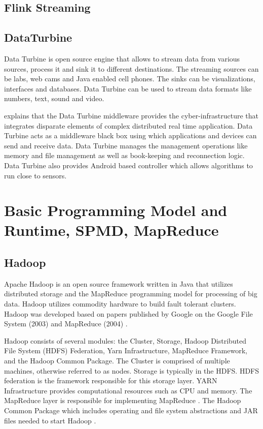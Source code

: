 \subsection{ Flink Streaming}
\subsection{ DataTurbine}

     Data Turbine \cite{www-data-turbine} is open source engine that
     allows to stream data from various sources, process it and sink
     it to different destinations. The streaming sources can be labs,
     web cams and Java enabled cell phones. The sinks can be
     visualizations, interfaces and databases.  Data Turbine can be
     used to stream data formats like numbers, text, sound and video.

     \cite{osdt-ecologicalsociety} explains that the Data Turbine
     middleware provides the cyber-infrastructure that integrates
     disparate elements of complex distributed real time
     application. Data Turbine acts as a middleware black box using
     which applications and devices can send and receive data. Data
     Turbine manages the management operations like memory and file
     management as well as book-keeping and reconnection logic.  Data
     Turbine also provides Android based controller which allows
     algorithms to run close to sensors.


\section{Basic Programming Model and Runtime, SPMD, MapReduce}


\subsection{ Hadoop}

     Apache Hadoop is an open source framework written in Java that 
     utilizes distributed storage and the MapReduce programming model 
     for processing of big data. Hadoop utilizes commodity hardware to 
     build fault tolerant clusters.  Hadoop was developed based on 
     papers published by Google on the Google File System (2003) and 
     MapReduce (2004) \cite{www-wikihadoop}.

     Hadoop consists of several modules: the Cluster, Storage, Hadoop 
     Distributed File System (HDFS) Federation, Yarn Infrastructure, 
     MapReduce Framework, and the Hadoop Common Package.  The Cluster 
     is comprised of multiple machines, otherwise referred to as nodes.  
     Storage is typically in the HDFS.  HDFS federation is the framework 
     responsible for this storage layer.  YARN Infrastructure provides 
     computational resources such as CPU and memory. The MapReduce layer 
     is responsible for implementing MapReduce \cite{www-hadooparch2}.  
     The Hadoop Common Package which includes operating and file system 
     abstractions and JAR files needed to start Hadoop 
     \cite{www-wikihadoop}. 



